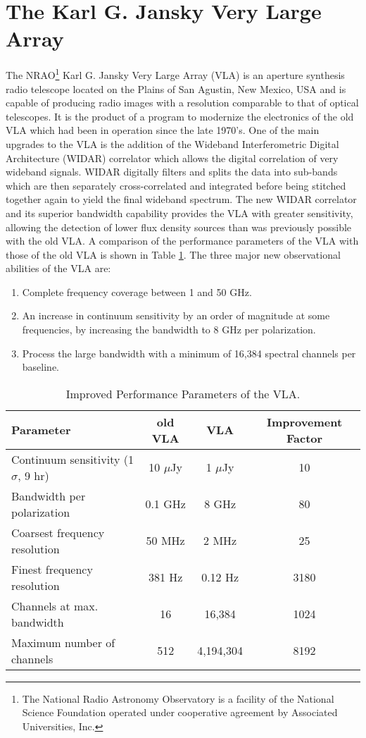 \section{The Karl G. Jansky Very Large Array}\label{sec:3.5}
The NRAO\footnote{The National Radio Astronomy Observatory is a facility of the National Science Foundation operated under cooperative agreement by Associated Universities, Inc.} Karl G. Jansky Very Large Array (VLA) is an aperture synthesis radio telescope located on the Plains of San Agustin, New Mexico, USA and is capable of producing radio images with a resolution comparable to that of optical telescopes. It is the product of a program to modernize the electronics of the old VLA which had been in operation since the late 1970's. One of the main upgrades to the VLA is the addition of the Wideband Interferometric Digital Architecture (WIDAR) correlator which allows the digital correlation of very wideband signals. WIDAR digitally filters and splits the data into sub-bands which are then separately cross-correlated and integrated before being stitched together again to yield the final wideband spectrum. The new WIDAR correlator and its superior bandwidth capability provides the VLA with greater sensitivity, allowing the detection of lower flux density sources than was previously possible with the old VLA. A comparison of the performance parameters of the VLA with those of the old VLA is shown in Table \ref{tab:3.1}. The three major new observational abilities of the VLA are:
\begin{enumerate}
\item Complete frequency coverage between 1 and 50 GHz.
\item An increase in continuum sensitivity by an order of magnitude at some frequencies, by increasing the bandwidth to 8 GHz per polarization.
\item Process the large bandwidth with a minimum of 16,384 spectral channels per baseline.
\end{enumerate}

\begin{table}
\begin{center}
\caption[Improved Performance Parameters of the VLA.]
{Improved Performance Parameters of the VLA.}
\begin{tabular}{lccc}
\hline
\hline
\rule{0pt}{2.5ex}Parameter & old VLA & VLA & Improvement Factor \\
\hline
\rule{0pt}{2.5ex}Continuum sensitivity (1$\sigma$, 9 hr) & 10 $\mu$Jy & 1 $\mu$Jy& 10\\
Bandwidth per polarization & 0.1 GHz & 8 GHz & 80\\ 
Coarsest frequency resolution & 50 MHz & 2 MHz & 25\\ 
Finest frequency resolution & 381 Hz & 0.12 Hz & 3180\\ 
Channels at max. bandwidth & 16 & 16,384 & 1024\\ 
Maximum number of channels & 512 & 4,194,304 & 8192\\ 
\hline
\end{tabular}
\label{tab:3.1}
\end{center}
\end{table}


